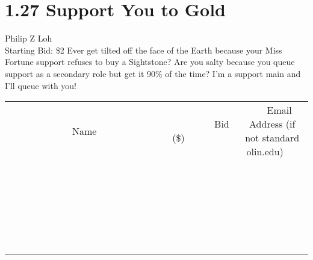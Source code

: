 \documentclass[11pt]{article}
\begin{document}
\section*{1.27 Support You to Gold}
Philip Z Loh
\\
Starting Bid: \$2
\newline
Ever get tilted off the face of the Earth because your Miss Fortune support refuses to buy a Sightstone? Are you salty because you queue support as a secondary role but get it 90\% of the time? I'm a support main and I'll queue with you!
\\[6ex]
\begin{tabular}{c c c}
~~~~~~~~~~~~~Name~~~~~~~~~~~~~ & ~~~~~~~~~Bid (\$)~~~~~~~~~  & ~~~Email Address (if not standard olin.edu)~~~\\
 & & \\
\hline
 & & \\
\hline
 & & \\
\hline
 & & \\
\hline
 & & \\
\hline
 & & \\
\hline
 & & \\
\hline
 & & \\
\hline
 & & \\
\hline
 & & \\
\hline
 & & \\
\hline
 & & \\
\hline
 & & \\
\hline
 & & \\
\hline
 & & \\
\hline
 & & \\
\hline
 & & \\
\hline
 & & \\
\hline
 & & \\
\hline
 & & \\
\hline
 & & \\
\hline
 & & \\
\hline
 & & \\
\hline
 & & \\
\hline
 & & \\
\hline
 & & \\
\hline
\end{tabular}
\newpage
\end{document}
